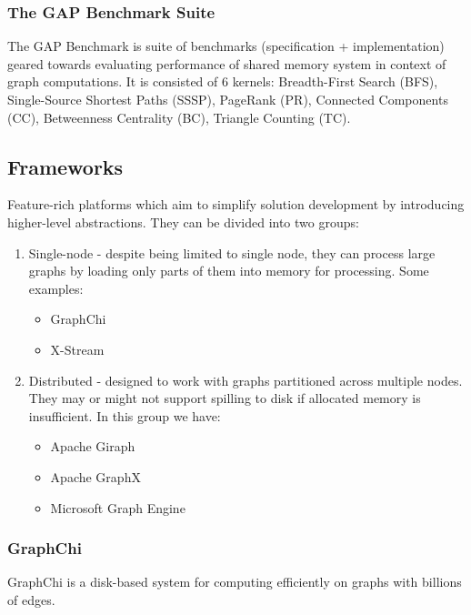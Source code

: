 \subsubsection{The GAP Benchmark Suite}
The GAP Benchmark \cite{gap-graphs} is suite of benchmarks (specification + implementation) geared towards evaluating performance of shared memory system in context of graph computations. It is consisted of 6 kernels: Breadth-First Search (BFS), Single-Source Shortest Paths (SSSP), PageRank (PR), Connected Components (CC), Betweenness Centrality (BC), Triangle Counting (TC).

\subsection{Frameworks}
Feature-rich platforms which aim to simplify solution development by introducing higher-level abstractions. They can be divided into two groups:
\begin{enumerate}
    \item Single-node - despite being limited to single node, they can process large graphs by loading only parts of them into memory for processing. Some examples:
    \begin{itemize}
        \item GraphChi
        \item X-Stream
    \end{itemize}
    
    \item Distributed - designed to work with graphs partitioned across multiple nodes. They may or might not support spilling to disk if allocated memory is insufficient. In this group we have:
    \begin{itemize}
        \item Apache Giraph
        \item Apache GraphX
        \item Microsoft Graph Engine
    \end{itemize}
\end{enumerate}

\subsubsection{GraphChi}
GraphChi is a disk-based system for computing efficiently on graphs with billions of edges.

